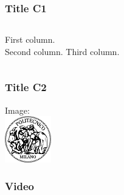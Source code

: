 \documentclass[c]{beamer}
\begin{document}
\begin{frame}
\frametitle{Title C1}

\begin{columns}[t, onlytextwidth]
First column.\\
\pause{}
Second column.
\pause
{}
Third column.
\end{columns}

\end{frame}


\begin{frame}
\frametitle{Title C2}


\centering
Image:\\
\bigskip\bigskip
\includegraphics[height=2cm]{gfx/logo-polimi}

\end{frame}


\begin{frame}
\frametitle{Video}

\end{frame}
\end{document}
